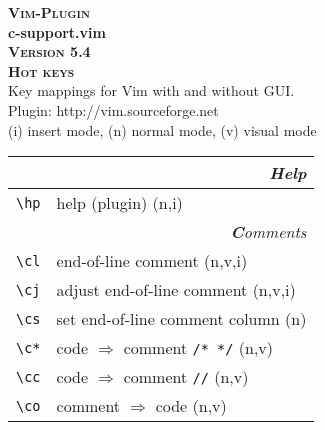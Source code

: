 \documentclass[oneside,10pt,landscape,DIV16]{scrartcl}
\newcommand{\Pluginversion}{5.4}
\begin{document}
%

\begin{multicols}{3}
%
\begin{center}
\textbf{\textsc{\small{Vim-Plugin}}}\\
\textbf{\LARGE{c-support.vim}}\\
\textbf{\textsc{\small{Version \Pluginversion}}}\\
\textbf{\textsc{\Huge{Hot keys}}}\\ 
Key mappings for Vim with and without GUI.\\
Plugin: http://vim.sourceforge.net\\
\vspace{2.0mm}
{\normalsize (i)} insert mode, {\normalsize (n)} normal mode, {\normalsize (v)} visual mode\\
\vspace{3.0mm}
%
\begin{tabular}[]{|p{11mm}|p{58mm}|}
\hline 
\multicolumn{2}{|r|}{\textsl{\textbf{H}elp}}\\
\hline \verb'\hp'   & help (plugin) \hfill (n,i)\\
\hline 
\hline
\multicolumn{2}{|r|}{\textsl{\textbf{C}omments}} \\
\hline \verb'\cl' & end-of-line comment                     \hfill (n,v,i)\\
\hline \verb'\cj' & adjust end-of-line comment              \hfill (n,v,i)\\
\hline \verb'\cs' & set end-of-line comment column          \hfill (n)    \\
\hline \verb'\c*' & code $\Rightarrow$ comment \verb'/* */' \hfill (n,v)  \\
\hline \verb'\cc' & code $\Rightarrow$ comment \verb'//'    \hfill (n,v)  \\
\hline \verb'\co' & comment $\Rightarrow$ code              \hfill (n,v)  \\


\end{tabular}
\end{center}
\end{multicols}
\end{document}
